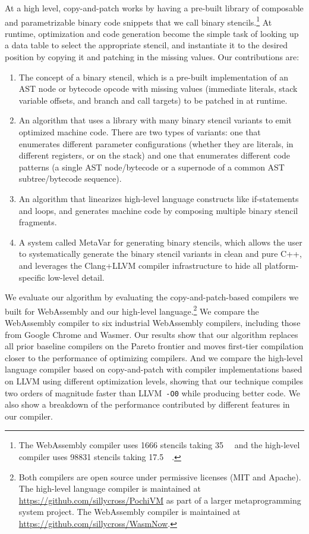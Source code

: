 \documentclass[acmsmall,nonacm,screen]{acmart}\settopmatter{printfolios=true,printccs=true,printacmref=false}
\newcommand{\llvm}{LLVM}
\newcommand{\ozero}{\texttt{-O0}}
\newcommand{\cp}{copy-and-patch}
\newcommand{\stencilNum}{\num{98831}}
\newcommand{\stencilSize}{\SI{17.5}{\mega\byte}}
\newcommand{\wasmStencilNum}{\num{1666}}%
\newcommand{\wasmStencilSize}{\SI{35}{\kilo\byte}}%
\begin{document}
At a high level, \cp{} works by having a pre-built library of composable and parametrizable binary code snippets that we call binary stencils.\footnote{The WebAssembly compiler uses \wasmStencilNum{} stencils taking \wasmStencilSize{} and the high-level compiler uses \stencilNum{} stencils taking \stencilSize{}.} At runtime, optimization and code generation become the simple task of looking up a data table to select the appropriate stencil, and instantiate it to the desired position by copying it and patching in the missing values. 
Our contributions are:
\begin{enumerate}
    
    \item The concept of a binary stencil, which is a pre-built implementation of an AST node or bytecode opcode with missing values (immediate literals, stack variable offsets, and branch and call targets) to be patched in at runtime.
    
    \item An algorithm that uses a library with many binary stencil variants to emit optimized machine code. There are two types of variants: one that enumerates different parameter configurations (whether they are literals, in different registers, or on the stack) and one that enumerates different code patterns (a single AST node/bytecode or a supernode of a common AST subtree/bytecode sequence).

    \item An algorithm that linearizes high-level language constructs like if-statements and loops, and generates machine code by composing multiple binary stencil fragments.
    
    \item A system called MetaVar for generating binary stencils, which allows the user to systematically generate the binary stencil variants in clean and pure C++, and leverages the Clang+LLVM compiler infrastructure to hide all platform-specific low-level detail.
    
\end{enumerate}

We evaluate our algorithm by evaluating the \cp{}-based compilers we built for WebAssembly and our high-level language.\footnote{Both compilers are open source under permissive licenses (MIT and Apache). The high-level language compiler is maintained at \url{https://github.com/sillycross/PochiVM} as part of a larger metaprogramming system project. The WebAssembly compiler is maintained at \url{https://github.com/sillycross/WasmNow}.} We compare the WebAssembly compiler to six industrial WebAssembly compilers, including those from Google Chrome and Wasmer. Our results show that our algorithm replaces all prior baseline compilers on the Pareto frontier and moves first-tier compilation closer to the performance of optimizing compilers. And we compare the high-level language compiler based on \cp{} with compiler implementations based on \llvm{} using different optimization levels, showing that our technique compiles two orders of magnitude faster than \llvm{}~\ozero{} while producing better code. We also show a breakdown of the performance contributed by different features in our compiler.
\end{document}
